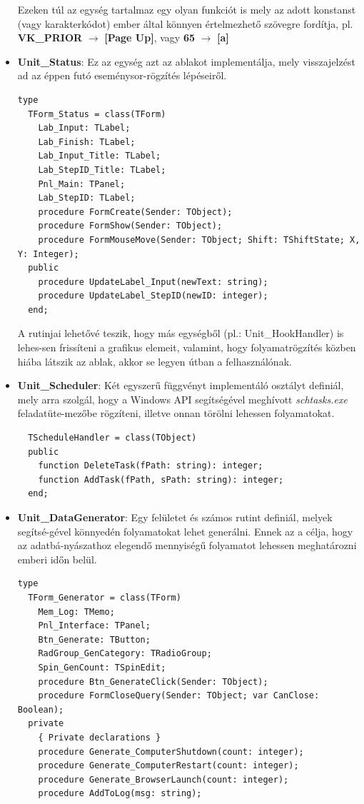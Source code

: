 \begin{itemize}
{Ezeken túl az egység tartalmaz egy olyan funkciót is mely az adott konstanst (vagy karakterkódot) ember által könnyen értelmezhető szövegre fordítja, pl. \textbf{VK\_PRIOR} $\rightarrow$ \textbf{[Page Up]}, vagy \textbf{65} $\rightarrow$ \textbf{[a]}

	}
	\item{
		\textbf{Unit\_Status}: Ez az egység azt az ablakot implementálja, mely visszajelzést ad az éppen futó eseménysor-rögzítés lépéseiről.
		\begin{lstlisting}
type
  TForm_Status = class(TForm)
    Lab_Input: TLabel;
    Lab_Finish: TLabel;
    Lab_Input_Title: TLabel;
    Lab_StepID_Title: TLabel;
    Pnl_Main: TPanel;
    Lab_StepID: TLabel;
    procedure FormCreate(Sender: TObject);
    procedure FormShow(Sender: TObject);
    procedure FormMouseMove(Sender: TObject; Shift: TShiftState; X, Y: Integer);
  public
    procedure UpdateLabel_Input(newText: string);
    procedure UpdateLabel_StepID(newID: integer);
  end;
		\end{lstlisting}

A rutinjai lehetővé teszik, hogy más egységből (pl.: Unit\_HookHandler) is lehes\hyp{}sen frissíteni a grafikus elemeit, valamint, hogy folyamatrögzítés közben hiába látszik az ablak, akkor se legyen útban a felhasználónak.
	}
	\item{
		\textbf{Unit\_Scheduler}: Két egyszerű függvényt implementáló osztályt definiál, mely arra szolgál, hogy a Windows API segítségével meghívott \textit{schtasks.exe} feladatüte\hyp{}mezőbe rögzíteni, illetve onnan törölni lehessen folyamatokat.
	\begin{lstlisting}
  TScheduleHandler = class(TObject)
  public
    function DeleteTask(fPath: string): integer;
    function AddTask(fPath, sPath: string): integer;
  end;
	\end{lstlisting}
	}
	\item{
		\textbf{Unit\_DataGenerator}: Egy felületet és számos rutint definiál, melyek segítsé\hyp{}gével könnyedén folyamatokat lehet generálni. Ennek az a célja, hogy az adatbá\hyp{}nyászathoz elegendő mennyiségű folyamatot lehessen meghatározni emberi időn belül.

	\begin{lstlisting}
type
  TForm_Generator = class(TForm)
    Mem_Log: TMemo;
    Pnl_Interface: TPanel;
    Btn_Generate: TButton;
    RadGroup_GenCategory: TRadioGroup;
    Spin_GenCount: TSpinEdit;
    procedure Btn_GenerateClick(Sender: TObject);
    procedure FormCloseQuery(Sender: TObject; var CanClose: Boolean);
  private
    { Private declarations }
    procedure Generate_ComputerShutdown(count: integer);
    procedure Generate_ComputerRestart(count: integer);
    procedure Generate_BrowserLaunch(count: integer);
    procedure AddToLog(msg: string);


\end{lstlisting}}
\end{itemize}
